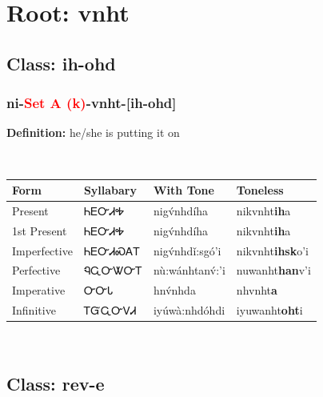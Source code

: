 \needspace{4in}
\section*{Root: vnht}
\nopagebreak
{}
\needspace{3in}
\subsection*{Class: ih-ohd}
\nopagebreak
\needspace{2in}
\subsubsection*{ni{-}\textcolor{Red}{Set A (k)}{-}\textbf{vnht}{-}[ih-ohd]}
\nopagebreak
\textbf{Definition: } he/she is putting it on
\\[0.5em]
\begin{tabularx}{\textwidth}{l X X X}%
\toprule%
\textbf{Form}&\textbf{Syllabary}&\textbf{With Tone}&\textbf{Toneless}\\%
\midrule%
Present&ᏂᎬᏅᏗᎭ&nigv́nhdíha&nikvnht\textbf{ih}a\\%
1st Present&ᏂᎬᏅᏗᎭ&nigv́nhdíha&nikvnht\textbf{ih}a\\%
Imperfective&ᏂᎬᏅᏗᏍᎪᎢ&nigv́nhdǐ:sgó’i&nikvnht\textbf{ihsk}o'i\\%
Perfective&ᏄᏩᏅᏔᏅᎢ&nù:wánhtanv́:’i&nuwanht\textbf{han}v'i\\%
Imperative&ᏅᏅᏓ&hnv́nhda&nhvnht\textbf{a}\\%
Infinitive&ᎢᏳᏩᏅᏙᏗ&iyúwà:nhdóhdi&iyuwanht\textbf{oht}i\\%
\bottomrule%
\end{tabularx}
\\[1em]
\needspace{3in}
\subsection*{Class: rev-e}
\nopagebreak
\needspace{2in}
